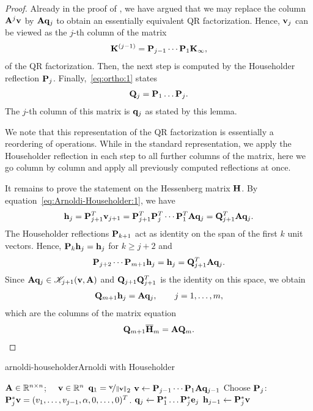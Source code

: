 \begin{proof}
  Already in the proof of , we
  have argued that we may replace the column $\mathbf A^{j}\mathbf v$ by
  $\mathbf A\mathbf q_{j}$ to obtain an essentially equivalent QR factorization. Hence,
  $\mathbf v_j$ can be viewed as the $j$-th column of the matrix
  \begin{gather}
    \mathbf K^{(j-1)} = \mathbf P_{j-1}\cdots \mathbf P_1 \mathbf K_{\infty},
  \end{gather}
  of the QR factorization. Then, the next step is computed by the
  Householder reflection $\mathbf P_j$. Finally,~\eqref{eq:ortho:1} states
  \begin{gather}
    \mathbf Q_j = \mathbf P_1\dots\mathbf P_j.
  \end{gather}
  The $j$-th column of this matrix is $\mathbf q_j$ as stated by
  this lemma.

  We note that this representation of the QR factorization is
  essentially a reordering of operations. While in the standard
  representation, we apply the Householder reflection in each step to
  all further columns of the matrix, here we go column by column and
  apply all previously computed reflections at once.

  It remains to prove the statement on the Hessenberg matrix
  $\mathbf H$. By equation~\eqref{eq:Arnoldi-Householder:1}, we have
  \begin{gather}
    \mathbf h_j = \mathbf P_{j+1}^T\mathbf v_{j+1}
    = \mathbf P_{j+1}^T\mathbf P_{j}^T\cdots\mathbf P_1^T\mathbf A\mathbf q_{j}
    = \mathbf Q_{j+1}^T\mathbf A\mathbf q_j.
  \end{gather}
  The Householder reflections $\mathbf P_{k+1}$ act as identity on the
  span of the first $k$ unit vectors. Hence, $\mathbf P_{k}\mathbf h_j = \mathbf h_j$ for $k\ge j+2$ and
  \begin{gather}
    \mathbf P_{j+2}\cdots\mathbf P_{m+1}\mathbf h_j = \mathbf h_j = \mathbf Q_{j+1}^T\mathbf A\mathbf q_j.
  \end{gather}
  Since $\mathbf A\mathbf q_j\in\mathscr K_{j+1}(\mathbf v,\mathbf A)$ and
  $\mathbf Q_{j+1}\mathbf Q_{j+1}^T$ is the identity on this space, we obtain
  \begin{gather}
    \mathbf Q_{m+1}\mathbf h_j = \mathbf A\mathbf q_j,\qquad j=1,\dots,m,
  \end{gather}
  which are the columns of the matrix equation
  \begin{gather}
    \mathbf Q_{m+1}\overline{\mathbf H}_m = \mathbf A\mathbf Q_{m}.
  \end{gather}
\end{proof}

\begin{Algorithm*}{arnoldi-householder}{Arnoldi with Householder}
  \begin{algorithmic}[1]
    \Require $\mathbf A\in\mathbb R^{n\times n}$; $\quad\mathbf v\in\mathbb R^n$
    \State $\mathbf q_1 = \nicefrac{\mathbf v}{\lVert\mathbf v\rVert}_2$
    \State $\mathbf v \gets \mathbf P_{j-1}\cdots\mathbf P_1\mathbf A\mathbf q_{j-1}$
    \State Choose $\mathbf P_j$: $\mathbf P_j^*\mathbf v = (v_1,\dots,v_{j-1},\alpha,0,\dots,0)^T$.
    \State $\mathbf q_j \gets \mathbf P_1^*\dots\mathbf P_j^*\mathbf e_j$
    \State $\mathbf h_{j-1} \gets \mathbf P_j^*\mathbf v$
    \EndFor
  \end{algorithmic}
\end{Algorithm*}

